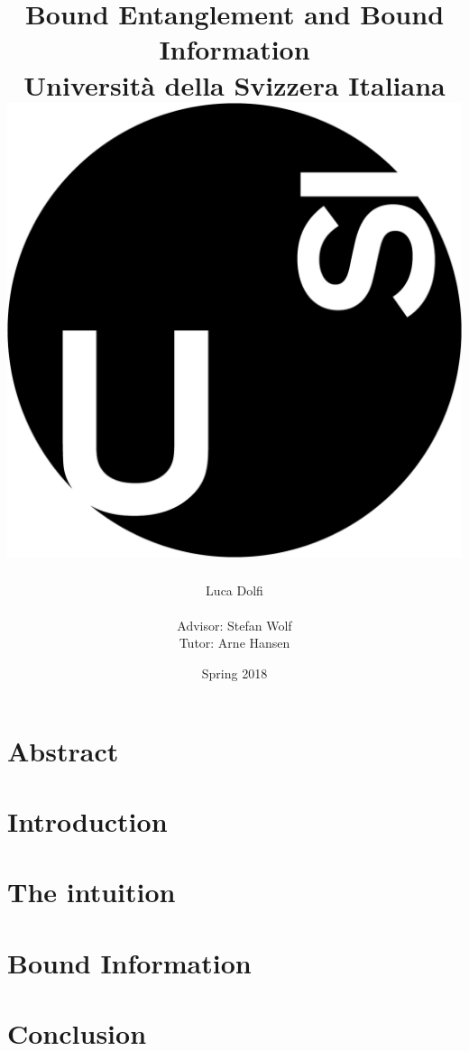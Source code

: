 \documentclass[titlepage]{report}
\title{
	{Bound Entanglement and Bound Information}\\
	{\large Universit\`a della Svizzera Italiana}\\
	\bigskip\medskip
	{\includegraphics[scale=0.12]{images/usi-immagini-logo-formatted.png}}
}
\author{Luca Dolfi\\ \\ Advisor: Stefan Wolf \\ Tutor: Arne Hansen}
\date{Spring 2018}
\begin{document}
\maketitle
\chapter*{Abstract}
\lipsum[1]
\tableofcontents

\chapter{Introduction}

		
\chapter{The intuition}

		
\chapter{Bound Information}

	
\chapter{Conclusion}


\printbibliography
\end{document}
